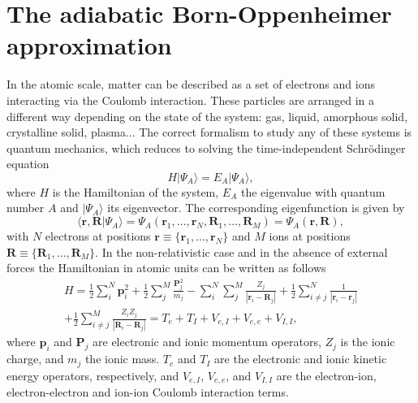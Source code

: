 
\chapter{The adiabatic Born-Oppenheimer approximation} %

\label{Chapter1} %


\newcommand{\keyword}[1]{\textbf{#1}}
\newcommand{\tabhead}[1]{\textbf{#1}}
\newcommand{\code}[1]{\texttt{#1}}
\newcommand{\file}[1]{\texttt{\bfseries#1}}
\newcommand{\option}[1]{\texttt{\itshape#1}}


In the atomic scale, matter can be described as a set of electrons and ions interacting via the Coulomb interaction. These particles are arranged in a different way depending on the state of the system: gas, liquid, amorphous 
solid, crystalline solid, plasma... The correct formalism to study any of these systems is quantum mechanics, which reduces to solving the time-independent Schr\"odinger equation
\begin{equation}
\label{schrodinger}
 H|\Psi_{A}\rangle=E_{A}|\Psi_{A}\rangle,
\end{equation}
where $H$ is the Hamiltonian of the system, $E_{A}$ the eigenvalue with quantum number $A$ and $|\Psi_{A}\rangle$ its eigenvector. The corresponding eigenfunction is given by
\begin{equation}
 \langle\mathbf{r},\mathbf{R}|\Psi_{A}\rangle=\Psi_{A}(\mathbf{r}_{1},\dots,\mathbf{r}_{N},\mathbf{R}_{1},\dots,\mathbf{R}_{M})=\Psi_{A}(\mathbf{r},\mathbf{R}),
\end{equation}
with $N$ electrons at positions $\mathbf{r}\equiv\{\mathbf{r}_{1},\dots,\mathbf{r}_{N}\}$ and $M$ ions at positions $\mathbf{R}\equiv\{\mathbf{R}_{1},\dots,\mathbf{R}_{M}\}$. In the non-relativistic case and in the absence of 
external forces the Hamiltonian in atomic units can be written as follows\cite{martin2004electronic}
\begin{multline}
 H=\frac{1}{2}\sum_{i}^{N}\mathbf{p}_{i}^{2}+\frac{1}{2}\sum_{j}^{M}\frac{\mathbf{P}_{j}^{2}}{m_{j}}-\sum_{i}^{N}\sum_{j}^{M}\frac{Z_{j}}{|\mathbf{r}_{i}-\mathbf{R}_{j}|}+\frac{1}{2}\sum_{i\ne j}^{N}\frac{1}{|\mathbf{r}_{i}-
 \mathbf{r}_{j}|}\\+\frac{1}{2}\sum_{i\ne j}^{M}\frac{Z_{i}Z_{j}}{|\mathbf{R}_{i}-\mathbf{R}_{j}|}=T_{e}+T_{I}+V_{e,I}+V_{e,e}+V_{I,I},
\end{multline}
where $\mathbf{p}_{i}$ and $\mathbf{P}_{j}$ are electronic and ionic momentum operators, $Z_{j}$ is the ionic charge, and $m_{j}$ the ionic mass. $T_{e}$ and $T_{I}$ are the electronic and ionic kinetic energy operators, 
respectively, and $V_{e,I}$, $V_{e,e}$, and $V_{I,I}$ are the electron-ion, electron-electron and ion-ion Coulomb interaction terms.  \\

